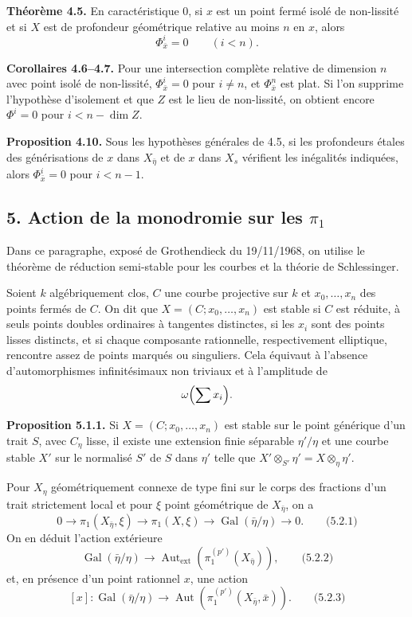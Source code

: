 \documentclass[11pt]{article}
\providecommand{\Gal}{\operatorname{Gal}}
\providecommand{\Aut}{\operatorname{Aut}}
\begin{document}
\textbf{Théorème 4.5.} En caractéristique $0$, si $x$ est un point fermé isolé de non-lissité et si $X$ est de profondeur géométrique relative au moins $n$ en $x$, alors
\[
\Phi^i_{\bar x}=0\qquad (i<n).
\]

\textbf{Corollaires 4.6--4.7.} Pour une intersection complète relative de dimension $n$ avec point isolé de non-lissité, $\Phi^i_{\bar x}=0$ pour $i\ne n$, et $\Phi^n_{\bar x}$ est plat. Si l'on supprime l'hypothèse d'isolement et que $Z$ est le lieu de non-lissité, on obtient encore $\Phi^i=0$ pour $i<n-\dim Z$.

\textbf{Proposition 4.10.} Sous les hypothèses générales de 4.5, si les profondeurs étales des générisations de $x$ dans $X_{\bar\eta}$ et de $x$ dans $X_s$ vérifient les inégalités indiquées, alors $\Phi^i_{\bar x}=0$ pour $i<n-1$.

\subsection*{5. Action de la monodromie sur les $\pi_1$}
Dans ce paragraphe, exposé de Grothendieck du 19/11/1968, on utilise le théorème de réduction semi-stable pour les courbes et la théorie de Schlessinger.

Soient $k$ algébriquement clos, $C$ une courbe projective sur $k$ et $x_0,\ldots,x_n$ des points fermés de $C$. On dit que $X=(C;x_0,\ldots,x_n)$ est stable si $C$ est réduite, à seuls points doubles ordinaires à tangentes distinctes, si les $x_i$ sont des points lisses distincts, et si chaque composante rationnelle, respectivement elliptique, rencontre assez de points marqués ou singuliers. Cela équivaut à l'absence d'automorphismes infinitésimaux non triviaux et à l'amplitude de
\[
\omega\Bigl(\sum x_i\Bigr).
\]

\textbf{Proposition 5.1.1.} Si $X=(C;x_0,\ldots,x_n)$ est stable sur le point générique d'un trait $S$, avec $C_\eta$ lisse, il existe une extension finie séparable $\eta'/\eta$ et une courbe stable $X'$ sur le normalisé $S'$ de $S$ dans $\eta'$ telle que $X'\otimes_{S'}\eta'=X\otimes_\eta\eta'$.

Pour $X_\eta$ géométriquement connexe de type fini sur le corps des fractions d'un trait strictement local et pour $\xi$ point géométrique de $X_{\bar\eta}$, on a
\[
0\to\pi_1(X_{\bar\eta},\xi)\to\pi_1(X,\xi)\to\Gal(\bar\eta/\eta)\to0.
\qquad\text{(5.2.1)}
\]
On en déduit l'action extérieure
\[
\Gal(\bar\eta/\eta)\to\Aut_{\mathrm{ext}}(\pi_1^{(p')}(X_{\bar\eta})),
\qquad\text{(5.2.2)}
\]
et, en présence d'un point rationnel $x$, une action
\[
[x]:\Gal(\bar\eta/\eta)\to\Aut(\pi_1^{(p')}(X_{\bar\eta},\bar x)).
\qquad\text{(5.2.3)}
\]
\end{document}
